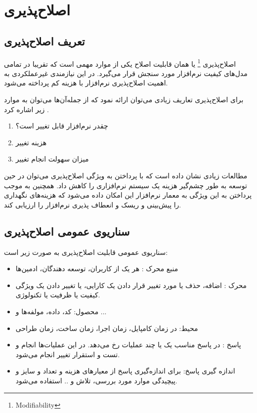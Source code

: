 \chapter{اصلاح‌پذیری}
\section{تعریف اصلاح‌پذیری}
اصلاح‌پذیری
\footnote{Modifiability}
یا همان قابلیت اصلاح یکی از موارد مهمی است که تقریبا در تمامی مدل‌های کیفیت نرم‌افزار مورد سنجش قرار می‌گیرد. در این نیازمندی غیرعملکردی به اهمیت اصلاح‌پذیری نرم‌افزار با هزینه کم پرداخته می‌شود.

برای اصلاح‌پذیری تعاریف زیادی می‌توان ارائه نمود که از جمله‌آن‌ها می‌توان به موارد زیر اشاره کرد \cite{mod:c1-cuibancan-2020}.

\begin{enumerate}
\item
چقدر نرم‌افزار قابل تغییر است؟
\item 
هزینه تغییر 
\item
میزان سهولت انجام تغییر
\end{enumerate}

مطالعات زیادی نشان داده است که با پرداختن به ویژگی اصلاح‌پذیری می‌توان در حین توسعه به طور چشم‌گیر هزینه یک سیستم‌ نرم‌افزاری را کاهش داد.
همچنین به موجب پرداختن به این ویژگی به معمار نرم‌افزار این امکان داده می‌شود که هزینه‌های نگهداری را پیش‌بینی و ریسک و انعطاف پذیری نرم‌افزار را ارزیابی کند.

\section{سناریوی عمومی اصلاح‌پذیری}

سناریو‌ی عمومی قابلیت اصلاح‌پذیری به صورت زیر است:
\begin{itemize}
\item
منبع محرک : هر یک از کاربران، توسعه دهندگان، ادمین‌ها
\item
محرک : اضافه، حذف یا مورد تغییر قرار دادن یک کارایی، یا تغییر دادن یک ویژگی کیفیت یا ظرفیت یا تکنولوژی.
\item
محصول:  کد، داده، مولفه‌ها و ...
\item
محیط: در زمان کامپایل، زمان اجرا، زمان ساخت، زمان طراحی
\item
پاسخ : در پاسخ مناسب یک یا چند عملیات رخ می‌دهد. 
در این عملیات‌ها انجام و تست و استقرار تغییر انجام می‌شود.
\item
اندازه گیری پاسخ: برای اندازه‌گیری پاسخ از معیار‌‌های هزینه و تعداد و سایز و پیچیدگی موارد مورد بررسی، تلاش و .. استفاده می‌شود.
\end{itemize}


